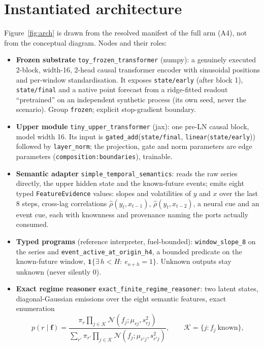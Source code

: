 \documentclass[10pt,a4paper]{article}
\newcommand{\code}[1]{\texttt{\small #1}}
\begin{document}
\section{Instantiated architecture}
\label{sec:arch}
Figure~\ref{fig:arch} is drawn from the resolved manifest of the full arm (A4), not from the conceptual diagram. Nodes and their roles:
\begin{itemize}\setlength{\itemsep}{1pt}
\item \textbf{Frozen substrate} \code{toy\_frozen\_transformer} (numpy): a genuinely executed 2-block, width-16, 2-head causal transformer encoder with sinusoidal positions and per-window standardisation. It exposes \code{state/early} (after block 1), \code{state/final} and a native point forecast from a ridge-fitted readout ``pretrained'' on an independent synthetic process (its own seed, never the scenario). Group \code{frozen}; explicit stop-gradient boundary.
\item \textbf{Upper module} \code{tiny\_upper\_transformer} (jax): one pre-LN causal block, model width 16. Its input is \code{gated\_add}(\code{state/final}, \code{linear}(\code{state/early})) followed by \code{layer\_norm}; the projection, gate and norm parameters are edge parameters (\code{composition:boundaries}), trainable.
\item \textbf{Semantic adapter} \code{simple\_temporal\_semantics}: reads the raw series directly, the upper hidden state and the known-future events; emits eight typed \code{FeatureEvidence} values: slopes and volatilities of $y$ and $x$ over the last 8 steps, cross-lag correlations $\hat\rho(y_t,x_{t-1})$, $\hat\rho(y_t,x_{t-2})$, a neural cue and an event cue, each with knownness and provenance naming the ports actually consumed.
\item \textbf{Typed programs} (reference interpreter, fuel-bounded): \code{window\_slope\_8} on the series and \code{event\_active\_at\_origin\_h4}, a bounded predicate on the known-future window, $\mathbf 1\{\exists\,h<H:\ e_{o+h}=1\}$. Unknown outputs stay unknown (never silently 0).
\item \textbf{Exact regime reasoner} \code{exact\_finite\_regime\_reasoner}: two latent states, diagonal-Gaussian emissions over the eight semantic features, exact enumeration
\begin{equation}
p(r\mid \mathbf f)=\frac{\pi_r\prod_{j\in\mathcal K}\mathcal N(f_j;\mu_{r j},s_{r j}^2)}{\sum_{r'}\pi_{r'}\prod_{j\in\mathcal K}\mathcal N(f_j;\mu_{r' j},s_{r' j}^2)},\qquad \mathcal K=\{j: f_j\ \text{known}\},
\end{equation}

\end{itemize}
\end{document}
